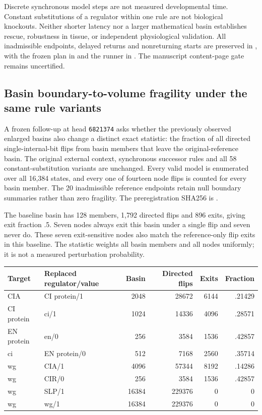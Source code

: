 Discrete synchronous model steps are not measured developmental time. Constant substitutions of a regulator within one rule are not biological knockouts. Neither shorter latency nor a larger mathematical basin establishes rescue, robustness in tissue, or independent physiological validation. All inadmissible endpoints, delayed returns and nonreturning starts are preserved in , with the frozen plan in  and the runner in . The manuscript content-page gate remains uncertified.

\subsection{Basin boundary-to-volume fragility under the same rule variants}
A frozen follow-up at head \texttt{6821374} asks whether the previously observed enlarged basins also change a distinct exact statistic: the fraction of all directed single-internal-bit flips from basin members that leave the original-reference basin. The original external context, synchronous successor rules and all 58 constant-substitution variants are unchanged. Every valid model is enumerated over all 16,384 states, and every one of fourteen node flips is counted for every basin member. The 20 inadmissible reference endpoints retain null boundary summaries rather than zero fragility. The preregistration SHA256 is .

The baseline basin has 128 members, 1,792 directed flips and 896 exits, giving exit fraction .5. Seven nodes always exit this basin under a single flip and seven never do. These seven exit-sensitive nodes also match the reference-only flip exits in this baseline. The statistic weights all basin members and all nodes uniformly; it is not a measured perturbation probability.

\begin{center}
\begin{tabular}{llrrrr}
\toprule
Target & Replaced regulator/value & Basin & Directed flips & Exits & Fraction\\
\midrule
CIA & CI protein/1 & 2048 & 28672 & 6144 & .21429\\
CI protein & ci/1 & 1024 & 14336 & 4096 & .28571\\
EN protein & en/0 & 256 & 3584 & 1536 & .42857\\
ci & EN protein/0 & 512 & 7168 & 2560 & .35714\\
wg & CIA/1 & 4096 & 57344 & 8192 & .14286\\
wg & CIR/0 & 256 & 3584 & 1536 & .42857\\
wg & SLP/1 & 16384 & 229376 & 0 & 0\\
wg & wg/1 & 16384 & 229376 & 0 & 0\\
\bottomrule
\end{tabular}
\end{center}

